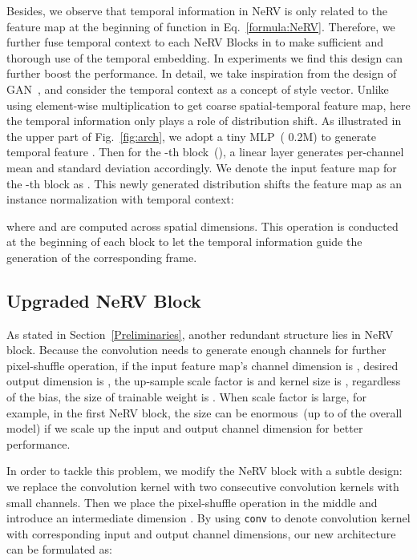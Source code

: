 \documentclass[runningheads]{llncs}
\begin{document}
Besides, we observe that temporal information in NeRV is only related to the feature map at the beginning of function  in Eq.~\ref{formula:NeRV}. Therefore, we further fuse temporal context to each NeRV Blocks in  to make sufficient and thorough use of the temporal embedding. In experiments we find this design can further boost the performance. In detail, we take inspiration from the design of GAN~\cite{huang2017arbitrary}, and consider the temporal context as a concept of style vector. Unlike using element-wise multiplication to get coarse spatial-temporal feature map, here the temporal information only plays a role of distribution shift. As illustrated in the upper part of Fig.~\ref{fig:arch}, we adopt a tiny MLP~( 0.2M) to generate temporal feature . Then for the -th block~(), a linear layer  generates per-channel mean  and standard deviation  accordingly. We denote the input feature map for the -th block as . This newly generated distribution shifts the feature map as an instance normalization with temporal context:


where  and  are computed across spatial dimensions. This operation is conducted at the beginning of each block to let the temporal information guide the generation of the corresponding frame.


\subsection{Upgraded NeRV Block}
\label{bottleneck}

As stated in Section~\ref{Preliminaries}, another redundant structure lies in NeRV block. Because the convolution needs to generate enough channels for further pixel-shuffle operation, if the input feature map's channel dimension is , desired output dimension is , the up-sample scale factor is  and kernel size is , regardless of the bias, the size of trainable weight is . When scale factor  is large, for example,  in the first NeRV block, the size can be enormous~(up to  of the overall model) if we scale up the input and output channel dimension for better performance.

In order to tackle this problem, we modify the NeRV block with a subtle design: we replace the convolution kernel with two consecutive convolution kernels with small channels. Then we place the pixel-shuffle operation in the middle and introduce an intermediate dimension . By using \texttt{conv} to denote convolution kernel with corresponding input and output channel dimensions, our new architecture can be formulated as:
\end{document}
